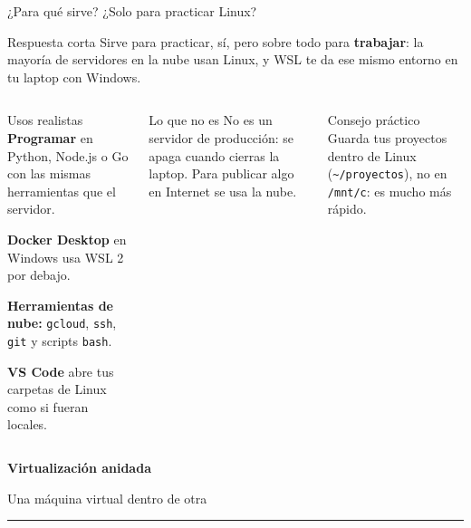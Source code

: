 \documentclass[aspectratio=169,10pt,c]{beamer}
\begin{document}
\begin{frame}{¿Para qué sirve? ¿Solo para practicar Linux?}
\begin{block}{Respuesta corta}
\small Sirve para practicar, sí, pero sobre todo para \textbf{trabajar}: la mayoría de servidores en la nube usan Linux, y WSL te da ese mismo entorno en tu laptop con Windows.
\end{block}
\begin{columns}[T,onlytextwidth]
\begin{exampleblock}{Usos realistas}
\small
\textbf{Programar} en Python, Node.js o Go con las mismas herramientas que el servidor.\par\smallskip
\textbf{Docker Desktop} en Windows usa WSL 2 por debajo.\par\smallskip
\textbf{Herramientas de nube:} \texttt{gcloud}, \texttt{ssh}, \texttt{git} y scripts \texttt{bash}.\par\smallskip
\textbf{VS Code} abre tus carpetas de Linux como si fueran locales.
\end{exampleblock}
\begin{block}{Lo que no es}
\small No es un servidor de producción: se apaga cuando cierras la laptop. Para publicar algo en Internet se usa la nube.
\end{block}
\begin{alertblock}{Consejo práctico}
\small Guarda tus proyectos dentro de Linux (\texttt{\textasciitilde/proyectos}), no en \texttt{/mnt/c}: es mucho más rápido.
\end{alertblock}
\end{columns}
\end{frame}

\begin{frame}[plain]
\vfill
\begin{center}
{\fontsize{29}{34}\selectfont\bfseries Virtualización anidada}\par
\vspace{2mm}
{\small Una máquina virtual dentro de otra}\par
\vspace{4mm}
{\color{utpRojo}\rule{8.5cm}{1.2pt}}
\end{center}
\vfill
\end{frame}
\end{document}
